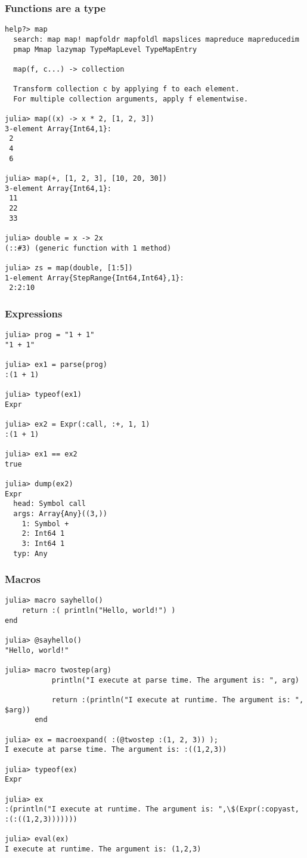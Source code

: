 \begin{frame}[fragile]
	\frametitle{Functions are a type}
  \begin{tiny}
  \begin{verbatim}
help?> map
  search: map map! mapfoldr mapfoldl mapslices mapreduce mapreducedim
  pmap Mmap lazymap TypeMapLevel TypeMapEntry

  map(f, c...) -> collection

  Transform collection c by applying f to each element.
  For multiple collection arguments, apply f elementwise.

julia> map((x) -> x * 2, [1, 2, 3])
3-element Array{Int64,1}:
 2
 4
 6

julia> map(+, [1, 2, 3], [10, 20, 30])
3-element Array{Int64,1}:
 11
 22
 33

julia> double = x -> 2x
(::#3) (generic function with 1 method)

julia> zs = map(double, [1:5])
1-element Array{StepRange{Int64,Int64},1}:
 2:2:10
  \end{verbatim}
  \end{tiny}
\end{frame}

\begin{frame}[fragile]
	\frametitle{Expressions}
  \begin{tiny}
  \begin{verbatim}
julia> prog = "1 + 1"
"1 + 1"

julia> ex1 = parse(prog)
:(1 + 1)

julia> typeof(ex1)
Expr

julia> ex2 = Expr(:call, :+, 1, 1)
:(1 + 1)

julia> ex1 == ex2
true

julia> dump(ex2)
Expr
  head: Symbol call
  args: Array{Any}((3,))
    1: Symbol +
    2: Int64 1
    3: Int64 1
  typ: Any
  \end{verbatim}
  \end{tiny}
\end{frame}

\begin{frame}[fragile]
	\frametitle{Macros}
  \begin{tiny}
  \begin{verbatim}
julia> macro sayhello()
    return :( println("Hello, world!") )
end

julia> @sayhello()
"Hello, world!"

julia> macro twostep(arg)
           println("I execute at parse time. The argument is: ", arg)

           return :(println("I execute at runtime. The argument is: ", $arg))
       end

julia> ex = macroexpand( :(@twostep :(1, 2, 3)) );
I execute at parse time. The argument is: :((1,2,3))

julia> typeof(ex)
Expr

julia> ex
:(println("I execute at runtime. The argument is: ",\$(Expr(:copyast, :(:((1,2,3)))))))

julia> eval(ex)
I execute at runtime. The argument is: (1,2,3)
  \end{verbatim}
  \end{tiny}
\end{frame}

